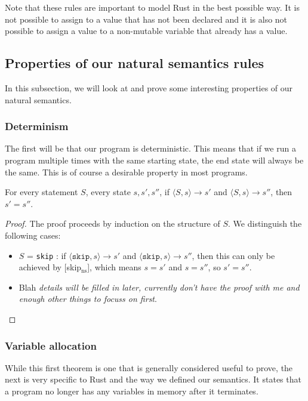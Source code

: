 Note that these rules are important to model Rust in the best possible way. It is not possible to assign to a value that has not been declared and it is also not possible to assign a value to a non-mutable variable that already has a value. 

\subsection{Properties of our natural semantics rules}
In this subsection, we will look at and prove some interesting properties of our natural semantics. 

\subsubsection*{Determinism}

The first will be that our program is deterministic. This means that if we run a program multiple times with the same starting state, the end state will always be the same. This is of course a desirable property in most programs.

\begin{theorem}
For every statement $S$, every state $s, s', s''$, if $\langle S, s \rangle \to s'$ and $\langle S, s \rangle \to s''$, then $s' = s''$.
\end{theorem}

\begin{proof}
The proof proceeds by induction on the structure of $S$. We distinguish the following cases:
\begin{itemize}[noitemsep]
    \item $S$ = \texttt{skip} : if $\langle \texttt{skip}, s \rangle \to s'$ and $\langle \texttt{skip}, s \rangle \to s''$, then this can only be achieved by [skip$_{\textrm{ns}}$], which means $s=s'$ and $s=s''$, so $s' = s''$. 
    \item Blah \emph{details will be filled in later, currently don't have the proof with me and enough other things to focuss on first}.
\end{itemize}
\end{proof}

\subsubsection*{Variable allocation}

While this first theorem is one that is generally considered useful to prove, the next is very specific to Rust and the way we defined our semantics. It states that a program no longer has any variables in memory after it terminates. 

